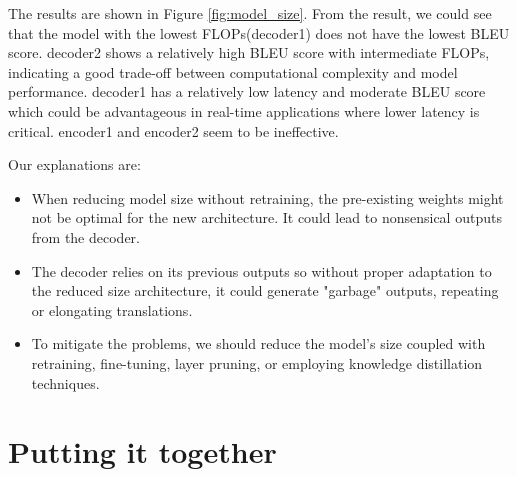\documentclass[11pt]{article}
\begin{document}
The results are shown in Figure \ref{fig:model_size}. From the result, we could see that the model with the lowest FLOPs(decoder1) does not have the lowest BLEU score. decoder2 shows a relatively high BLEU score with intermediate FLOPs, indicating a good trade-off between computational complexity and model performance. decoder1 has a relatively low latency and moderate BLEU score which could be advantageous in real-time applications where lower latency is critical. encoder1 and encoder2 seem to be ineffective. 

Our explanations are:
\begin{itemize}
  \item When reducing model size without retraining, the pre-existing weights might not be optimal for the new architecture. It could lead to nonsensical outputs from the decoder.
  
  \item The decoder relies on its previous outputs so without proper adaptation to the reduced size architecture, it could generate "garbage" outputs, repeating or elongating translations.

  \item To mitigate the problems, we should reduce the model's size coupled with retraining, fine-tuning, layer pruning, or employing knowledge distillation techniques.

\end{itemize}




\section{Putting it together}
\end{document}
